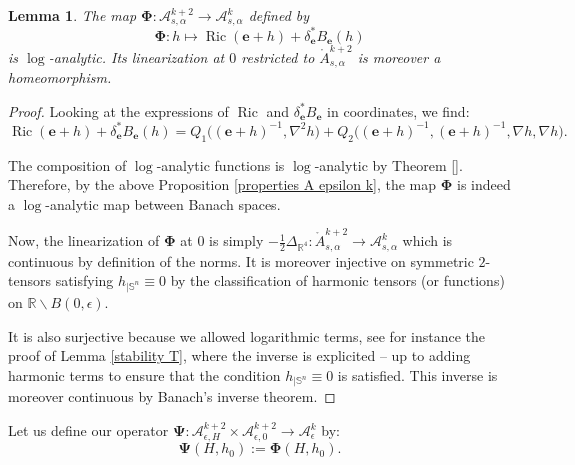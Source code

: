 \documentclass[12pt]{article}
\newtheorem{lem}[thm]{Lemma}
\DeclareMathOperator{\Ric}{\operatorname{Ric}}
\newcommand{\calA}{{\mathcal A}}
\begin{document}
    \begin{lem}\label{invertibility linearization}
        The map $\mathbf{\Phi}: \calA^{k+2}_{s,\alpha}\to \calA^{k}_{s,\alpha}$ defined by
        $$\mathbf{\Phi}: h\mapsto \Ric(\mathbf{e}+h)+ \delta^*_{\mathbf{e}}B_{\mathbf{e}}(h)$$
        is $\log$-analytic. Its linearization at $0$ restricted to $\mathring{A}_{s,\alpha}^{k+2}$ is moreover a homeomorphism.
    \end{lem}
    \begin{proof}
Looking at the expressions of $\Ric$ and $\delta_\mathbf{e}^*B_\mathbf{e}$ in coordinates, we find:
         $$\Ric (\mathbf{e}+h)+ \delta^*_{\mathbf{e}}B_{\mathbf{e}}(h) = Q_1\Big((\mathbf{e}+h)^{-1},\nabla^2 h\Big) + Q_2\Big((\mathbf{e}+h)^{-1},(\mathbf{e}+h)^{-1},\nabla h,\nabla h\Big).$$
        
    
    The composition of $\log$-analytic functions is $\log$-analytic by Theorem \ref{}. Therefore, by the above Proposition \ref{properties A epsilon k}, the map $\mathbf{\Phi}$ is indeed a $\log$-analytic map between Banach spaces.
    
    Now, the linearization of $\mathbf{\Phi}$ at $0$ is simply $-\frac{1}{2}\Delta_{\mathbb{R}^4}:\mathring{A}_{s,\alpha}^{k+2}\to \calA^k_{s,\alpha}$ which is continuous by definition of the norms. It is moreover injective on symmetric $2$-tensors satisfying $h_{|\mathbb{S}^n} \equiv 0$ by the classification of harmonic tensors (or functions) on $\mathbb{R}\backslash B(0,\epsilon)$. 
    
    It is also surjective because we allowed logarithmic terms, see for instance the proof of Lemma \ref{stability T}, where the inverse is explicited -- up to adding harmonic terms to ensure that the condition $h_{|\mathbb{S}^n} \equiv 0$ is satisfied. This inverse is moreover continuous by Banach's inverse theorem.
    \end{proof}
    
    
    Let us define our operator $\mathbf{\Psi}:\calA_{\epsilon,H}^{k+2}\times \calA_{\epsilon,0}^{k+2}\to \calA_{\epsilon}^k$ by:
    $$ \mathbf{\Psi}(H,h_0):= \mathbf{\Phi}(H,h_0). $$
    
\end{document}
